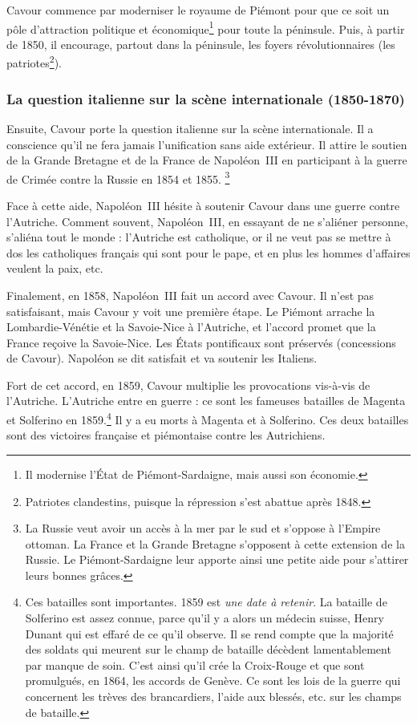 \documentclass[12pt]{report}
\begin{document}
Cavour commence par moderniser le royaume de Piémont pour que ce soit un pôle d’attraction politique et économique\footnote{Il modernise l'État de Piémont-Sardaigne, mais aussi son économie.} pour toute la péninsule. 
Puis, à partir de 1850, il encourage, partout dans la péninsule, les foyers révolutionnaires (les patriotes\footnote{Patriotes clandestins, puisque la répression s'est abattue après 1848.}). 

\subsubsection{La question italienne sur la scène internationale (1850-1870)}


Ensuite, Cavour porte la question italienne sur la scène internationale. 
Il a conscience qu’il ne fera jamais l’unification sans aide extérieur.
Il attire le soutien de la Grande Bretagne et de la France de Napoléon~III en participant à la guerre de Crimée contre la Russie en 1854 et 1855.
\footnote{La Russie veut avoir un accès à la mer par le sud et s'oppose à l'Empire ottoman. La France et la Grande Bretagne s'opposent à cette extension de la Russie. Le Piémont-Sardaigne leur apporte ainsi une petite aide pour s'attirer leurs bonnes grâces.}

Face à cette aide, Napoléon~III hésite à soutenir Cavour dans une guerre contre l’Autriche.
Comment souvent, Napoléon~III, en essayant de ne s’aliéner personne, s’aliéna tout le monde : l’Autriche est catholique, or il ne veut pas se mettre à dos les catholiques français qui sont pour le pape, et en plus les hommes d’affaires veulent la paix, etc.

Finalement, en 1858, Napoléon~III fait un accord avec Cavour.
Il n’est pas satisfaisant, mais Cavour y voit une première étape. 
Le Piémont arrache la Lombardie-Vénétie et la Savoie-Nice à l’Autriche, et l'accord promet que la France reçoive la Savoie-Nice.
Les États pontificaux sont préservés (concessions de Cavour).
Napoléon se dit satisfait et va soutenir les Italiens.

Fort de cet accord, en 1859, Cavour multiplie les provocations vis-à-vis de l’Autriche.
L’Autriche entre en guerre : ce sont les fameuses batailles de Magenta et Solferino en 1859.\footnote{Ces batailles sont importantes. 1859 est \emph{une date à retenir}. La bataille de Solferino est assez connue, parce qu'il y a alors un médecin suisse, Henry Dunant qui est effaré de ce qu'il observe. Il se rend compte que la majorité des soldats qui meurent sur le champ de bataille décèdent lamentablement par manque de soin. C'est ainsi qu'il crée la Croix-Rouge et que sont promulgués, en 1864, les accords de Genève. Ce sont les lois de la guerre qui concernent les trèves des brancardiers, l'aide aux blessés, etc. sur les champs de bataille.}
Il y a eu  morts à Magenta et  à Solferino.
Ces deux batailles sont des victoires française et piémontaise contre les Autrichiens.
\end{document}
